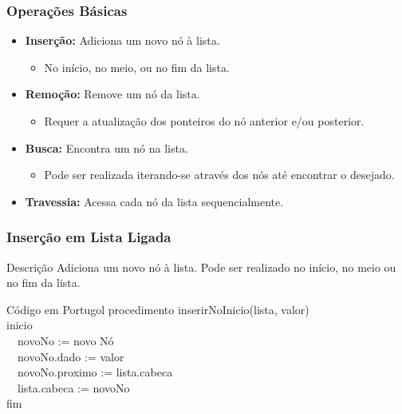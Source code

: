 \begin{frame}[fragile]
\frametitle{Operações Básicas}
\begin{itemize}
\item \textbf{Inserção:} Adiciona um novo nó à lista.
\begin{itemize}
\item No início, no meio, ou no fim da lista.
\end{itemize}
\item \textbf{Remoção:} Remove um nó da lista.
\begin{itemize}
\item Requer a atualização dos ponteiros do nó anterior e/ou posterior.
\end{itemize}
\item \textbf{Busca:} Encontra um nó na lista.
\begin{itemize}
\item Pode ser realizada iterando-se através dos nós até encontrar o desejado.
\end{itemize}
\item \textbf{Travessia:} Acessa cada nó da lista sequencialmente.
\end{itemize}
\end{frame}
\begin{frame}[fragile]
  \frametitle{Inserção em Lista Ligada}
  \begin{block}{Descrição}
    Adiciona um novo nó à lista. Pode ser realizado no início, no meio ou no fim da lista.
  \end{block}
  \small
  \begin{block}{Código em Portugol}
    procedimento inserirNoInicio(lista, valor) \\
    inicio \\
    \ \ novoNo := novo Nó \\
    \ \ novoNo.dado := valor \\
    \ \ novoNo.proximo := lista.cabeca \\
    \ \ lista.cabeca := novoNo \\
    fim
  \end{block}
\end{frame}

